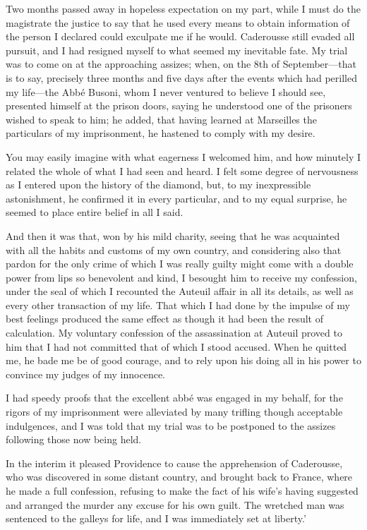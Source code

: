 Two months passed away in hopeless expectation on my part, while I must do the magistrate the justice to say that he used every means to obtain information of the person I declared could exculpate me if he would. Caderousse still evaded all pursuit, and I had resigned myself to what seemed my inevitable fate. My trial was to come on at the approaching assizes; when, on the 8th of September—that is to say, precisely three months and five days after the events which had perilled my life—the Abbé Busoni, whom I never ventured to believe I should see, presented himself at the prison doors, saying he understood one of the prisoners wished to speak to him; he added, that having learned at Marseilles the particulars of my imprisonment, he hastened to comply with my desire. 

You may easily imagine with what eagerness I welcomed him, and how minutely I related the whole of what I had seen and heard. I felt some degree of nervousness as I entered upon the history of the diamond, but, to my inexpressible astonishment, he confirmed it in every particular, and to my equal surprise, he seemed to place entire belief in all I said. 

And then it was that, won by his mild charity, seeing that he was acquainted with all the habits and customs of my own country, and considering also that pardon for the only crime of which I was really guilty might come with a double power from lips so benevolent and kind, I besought him to receive my confession, under the seal of which I recounted the Auteuil affair in all its details, as well as every other transaction of my life. That which I had done by the impulse of my best feelings produced the same effect as though it had been the result of calculation. My voluntary confession of the assassination at Auteuil proved to him that I had not committed that of which I stood accused. When he quitted me, he bade me be of good courage, and to rely upon his doing all in his power to convince my judges of my innocence. 

I had speedy proofs that the excellent abbé was engaged in my behalf, for the rigors of my imprisonment were alleviated by many trifling though acceptable indulgences, and I was told that my trial was to be postponed to the assizes following those now being held. 

 In the interim it pleased Providence to cause the apprehension of Caderousse, who was discovered in some distant country, and brought back to France, where he made a full confession, refusing to make the fact of his wife's having suggested and arranged the murder any excuse for his own guilt. The wretched man was sentenced to the galleys for life, and I was immediately set at liberty.' 

